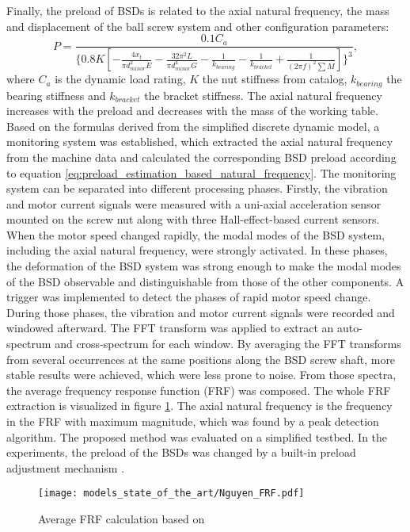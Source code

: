 Finally, the preload of BSDs is related to the axial natural frequency, the mass and displacement of the ball screw system and other configuration parameters:
\begin{equation}
    P=\frac{0.1C_{a}}{\{0.8K[ -\frac{4x_{t}}{\pi d_{minor}^{2}E} -\frac{32\pi^{2}L}{\pi d_{minor}^{4}G}-\frac{1}{k_{bearing}}-\frac{1}{k_{bracket}}+\frac{1}{(2\pi f)^{2}\sum M} ]\}^{3}},
\label{eq:preload_estimation_based_natural_frequency}
\end{equation}
where $C_{a}$ is the dynamic load rating, $K$ the nut stiffness from catalog, $k_{bearing}$ the bearing stiffness and $k_{bracket}$ the bracket stiffness. The axial natural frequency increases with the preload and decreases with the mass of the working table. Based on the formulas derived from the simplified discrete dynamic model, a monitoring system was established, which extracted the axial natural frequency from the machine data and calculated the corresponding BSD preload according to equation \ref{eq:preload_estimation_based_natural_frequency}. The monitoring system can be separated into different processing phases. Firstly, the vibration and motor current signals were measured with a uni-axial acceleration sensor mounted on the screw nut along with three Hall-effect-based current sensors. When the motor speed changed rapidly, the modal modes of the BSD system, including the axial natural frequency, were strongly activated. In these phases, the deformation of the BSD system was strong enough to make the modal modes of the BSD observable and distinguishable from those of the other components. A trigger was implemented to detect the phases of rapid motor speed change. During those phases, the vibration and motor current signals were recorded and windowed afterward. The FFT transform was applied to extract an auto-spectrum and cross-spectrum for each window. By averaging the FFT transforms from several occurrences at the same positions along the BSD screw shaft, more stable results were achieved, which were less prone to noise. From those spectra, the average frequency response function (FRF) was composed. The whole FRF extraction is visualized in figure \ref{fig:Nguyen_frf}. The axial natural frequency is the frequency in the FRF with maximum magnitude, which was found by a peak detection algorithm. The proposed method was evaluated on a simplified testbed. In the experiments, the preload of the BSDs was changed by a built-in preload adjustment mechanism \cite{NGUYEN2019}.

\begin{figure}[H]
  \centering
  \texttt{[image: models\_state\_of\_the\_art/Nguyen\_FRF.pdf]}
  \caption{Average FRF calculation based on \cite{NGUYEN2019}}
  \label{fig:Nguyen_frf}
\end{figure}

